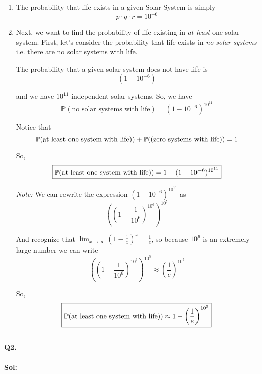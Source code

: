 \documentclass[twoside]{article}
\begin{document}
\begin{enumerate}[label=(\alph*)]
   \item The probability that life exists in a given Solar System is simply
   \[ \boxed{p \cdot q \cdot r  = 10^{-6}} \]
   \vskip 0.25cm

   \item Next, we want to find the probability of life existing in \emph{at least} one solar system. First, let's consider the probability that life exists in \emph{no solar systems} i.e. there are no solar systems with life. 

   The probability that a given solar system does not have life is 
   \[ (1 - 10^{-6})\]

   and we have $10^{11}$ independent solar systems. So, we have
   \[ \mathbb{P}(\text{no solar systems with life}) = (1 - 10^{-6})^{10^{11}}\]
   
   Notice that 
   \[ \mathbb{P}(\text{at least one system with life})) + \mathbb{P}((\text{zero systems with life})) = 1 \]

   So,
   \[ \boxed{\mathbb{P}(\text{at least one system with life})) = 1 - (1 - 10^{-6})^{10^{11}} } \]

   \emph{Note:} We can rewrite the expression $(1 - 10^{-6})^{10^{11}}$ as 
   \[ \left(\left(1 - \frac{1}{10^{6}}\right)^{10^{6}}\right)^{10^{5}} \]
   
   And recognize that $\lim_{x \rightarrow \infty} \left( 1 - \frac{1}{x} \right)^x = \frac{1}{e}$, so because $10^6$ is an extremely large number we can write 
   \[ \left(\left(1 - \frac{1}{10^{6}}\right)^{10^{6}}\right)^{10^{5}} \approx \left(\frac{1}{e}\right)^{10^{5}} \]

   So,
   \[ \boxed{\mathbb{P}(\text{at least one system with life})) \approx 1 - \left(\frac{1}{e}\right)^{10^{5}}} \]
\end{enumerate}

\vskip 0.25cm
\hrule
\vskip 1cm

\textbf{Q2.} 
\\
\\
\textbf{Sol:} 
\end{document}
